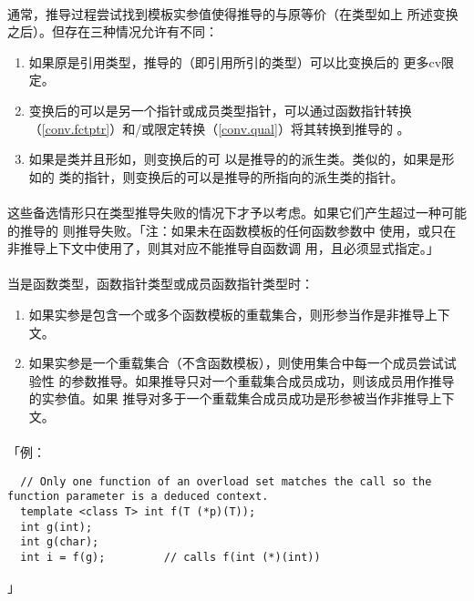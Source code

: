 \paragraph{}
通常，推导过程尝试找到模板实参值使得推导的与原等价（在类型如上
所述变换之后）。但存在三种情况允许有不同：
\begin{enumerate}
  \item{如果原是引用类型，推导的（即引用所引的类型）可以比变换后的
    更多cv限定。}
  \item{变换后的可以是另一个指针或成员类型指针，可以通过函数指针转换
    （\ref{conv.fctptr}）和/或限定转换（\ref{conv.qual}）将其转换到推导的
    。}
  \item{如果是类并且形如，则变换后的可
    以是推导的的派生类。类似的，如果是形如的
    类的指针，则变换后的可以是推导的所指向的派生类的指针。}
\end{enumerate}

\paragraph{}
这些备选情形只在类型推导失败的情况下才予以考虑。如果它们产生超过一种可能的推导的
则推导失败。「注：如果未在函数模板的任何函数参数中
使用，或只在非推导上下文中使用了，则其对应不能推导自函数调
用，且必须显式指定。」

\paragraph{}
当是函数类型，函数指针类型或成员函数指针类型时：
\begin{enumerate}
  \item{如果实参是包含一个或多个函数模板的重载集合，则形参当作是非推导上下文。}
  \item{如果实参是一个重载集合（不含函数模板），则使用集合中每一个成员尝试试验性
    的参数推导。如果推导只对一个重载集合成员成功，则该成员用作推导的实参值。如果
    推导对多于一个重载集合成员成功是形参被当作非推导上下文。}
\end{enumerate}

\paragraph{}
「例：
\begin{lstlisting}
  // Only one function of an overload set matches the call so the function parameter is a deduced context.
  template <class T> int f(T (*p)(T));
  int g(int);
  int g(char);
  int i = f(g);         // calls f(int (*)(int))
\end{lstlisting}」

